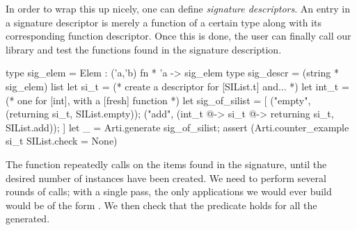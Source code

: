In order to wrap this up nicely, one can define \emph{signature descriptors}. An
entry in a signature descriptor is merely a function of a certain
type  along with its corresponding function descriptor. Once this is
done, the user can finally call our library and test the functions found in the
signature description.
%
\begin{ocamlcode}
type sig_elem = Elem : ('a,'b) fn * 'a -> sig_elem
type sig_descr = (string * sig_elem) list
let si_t  = (* create a descriptor for [SIList.t] and... *)
let int_t = (* one for [int], with a [fresh] function *)
let sig_of_silist = [
  ("empty", (returning si_t, SIList.empty));
  ("add", (int_t @-> si_t @-> returning si_t, SIList.add)); ]
let _ =
  Arti.generate sig_of_silist;
  assert (Arti.counter_example si_t SIList.check = None)
\end{ocamlcode}
%
The  function repeatedly calls  on the items found in
the signature, until the desired number of instances have been created. We need
to perform several rounds of calls; with a single pass, the only applications we
would ever build would be of the form . We then check that the
 predicate holds for all the  generated.
